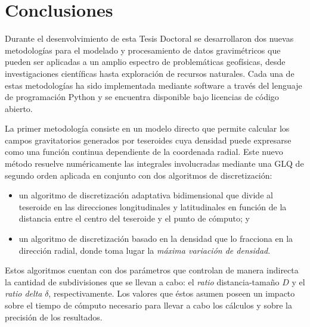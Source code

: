 \chapter{Conclusiones}

Durante el desenvolvimiento de esta Tesis Doctoral se desarrollaron dos nuevas
metodologías para el modelado y procesamiento de datos gravimétricos que pueden
ser aplicadas a un amplio espectro de problemáticas geofísicas,
desde investigaciones científicas hasta exploración de recursos
naturales.
Cada una de estas metodologías ha sido implementada mediante software a través
del lenguaje de programación Python y se encuentra disponible bajo licencias
de código abierto.

\vspace{1em}

La primer metodología consiste en un modelo directo que permite calcular los
campos gravitatorios generados por teseroides cuya densidad puede expresarse
como una función continua dependiente de la coordenada radial.
Este nuevo método resuelve numéricamente las integrales involucradas mediante
una \acl{GLQ} de segundo orden aplicada en conjunto con dos algoritmos de
discretización:
%
\begin{itemize}
    \item un algoritmo de discretización adaptativa bidimensional que divide al
        teseroide en las direcciones longitudinales y latitudinales en función
        de la distancia entre el centro del teseroide y el punto de cómputo; y
    \item  un algoritmo de discretización basado en la densidad que lo
        fracciona en la dirección radial, donde toma lugar la \emph{máxima
        variación de densidad}.
\end{itemize}

Estos algoritmos cuentan con dos parámetros que controlan de manera indirecta
la cantidad de subdivisiones que se llevan a cabo: el \emph{ratio}
distancia-tamaño $D$ y el \emph{ratio delta} $\delta$, respectivamente.
Los valores que éstos asumen poseen un impacto sobre el tiempo de cómputo
necesario para llevar a cabo los cálculos y sobre la precisión de los
resultados.

